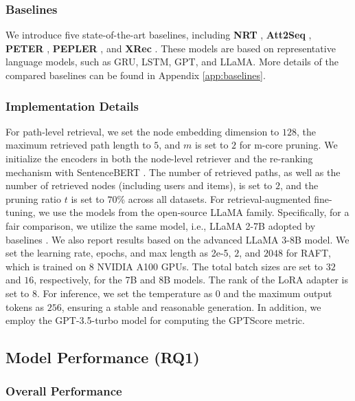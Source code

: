 \subsubsection{Baselines} We introduce five state-of-the-art baselines, including \textbf{NRT} \cite{li2017neural}, \textbf{Att2Seq} \cite{dong2017learning}, \textbf{PETER} \cite{li2021personalized}, \textbf{PEPLER} \cite{li2023personalized}, and \textbf{XRec} \cite{ma2024xrec}. These models are based on representative language models, such as GRU, LSTM, GPT, and LLaMA. More details of the compared baselines can be found in Appendix \ref{app:baselines}.

\subsubsection{Implementation Details} 

For path-level retrieval, we set the node embedding dimension to $128$, the maximum retrieved path length to $5$, and $m$ is set to $2$ for m-core pruning. We initialize the encoders in both the node-level retriever and the re-ranking mechanism with SentenceBERT \cite{reimers2019sentence}. The number of retrieved paths, as well as the number of retrieved nodes (including users and items), is set to $2$, and the pruning ratio $t$ is set to $70$\% across all datasets. For retrieval-augmented fine-tuning, we use the models from the open-source LLaMA family. Specifically, for a fair comparison, we utilize the same model, i.e., LLaMA 2-7B adopted by baselines \cite{ma2024xrec}. We also report results based on the advanced LLaMA 3-8B model. We set the learning rate, epochs, and max length as 2e-5, $2$, and $2048$ for RAFT, which is trained on 8 NVIDIA A100 GPUs. The total batch sizes are set to $32$ and $16$, respectively, for the 7B and 8B models. The rank of the LoRA adapter is set to $8$. For inference, we set the temperature as $0$ and the maximum output tokens as $256$, ensuring a stable and reasonable generation. In addition, we employ the GPT-3.5-turbo model for computing the GPTScore metric.

\subsection{Model Performance (RQ1)}

\subsubsection{Overall Performance}

